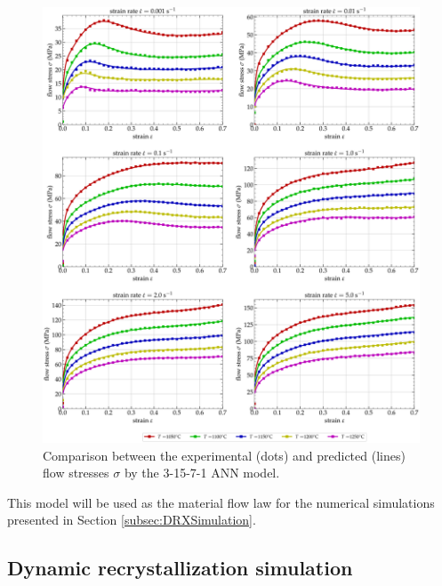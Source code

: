 \documentclass[metals,article,submit,pdftex,moreauthors]{Definitions/mdpi}
\begin{document}
\begin{figure}[H]
\centering
\includegraphics[width=0.9\columnwidth]{Figures/CompExpANN-3-15-7-1}
\caption{Comparison between the experimental (dots) and predicted (lines) flow stresses $\sigma$ by the 3-15-7-1 ANN model.}
\label{fig:ANN-3-15-7-1}
\end{figure}
This model will be used as the material flow law for the numerical simulations presented in Section \ref{subsec:DRXSimulation}.

\subsection{Dynamic recrystallization simulation\label{subsec:DRXSimulation}}
\end{document}
